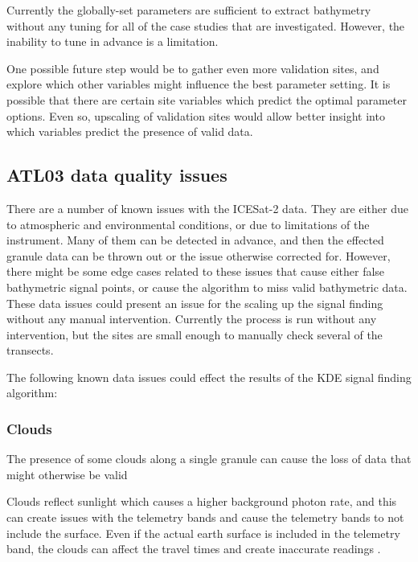 Currently the globally-set parameters are sufficient to extract bathymetry without any tuning for all of the case studies that are investigated. However, the inability to tune in advance is a limitation. 

One possible future step would be to gather even more validation sites, and explore which other variables might influence the best parameter setting. It is possible that there are certain site variables which predict the optimal parameter options. Even so, upscaling of validation sites would allow better insight into which variables predict the presence of valid data.  

\subsection{ATL03 data quality issues}\label{sec:discussion-photon-issues}

There are a number of known issues with the ICESat-2 data. They are either due to atmospheric and environmental conditions, or due to limitations of the instrument. Many of them can be detected in advance, and then the effected granule data can be thrown out or the issue otherwise corrected for. However, there might be some edge cases related to these issues that cause either false bathymetric signal points, or cause the algorithm to miss valid bathymetric data. These data issues could present an issue for the scaling up the signal finding without any manual intervention. Currently the process is run without any intervention, but the sites are small enough to manually check several of the transects.

The following known data issues could effect the results of the KDE signal finding algorithm:

\subsubsection{Clouds}

The presence of some clouds along a single granule can cause the loss of data that might otherwise be valid

Clouds reflect sunlight which causes a higher background photon rate, and this can create issues with the telemetry bands and cause the telemetry bands to not include the surface. Even if the actual earth surface is included in the telemetry band, the clouds can affect the travel times and create inaccurate readings \parencite{atl03knownissues}.

